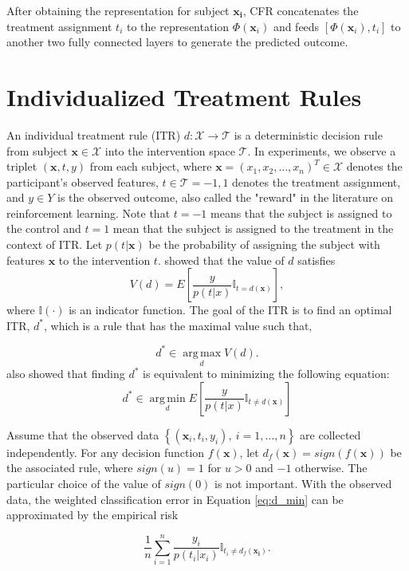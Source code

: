 \documentclass{article}
\begin{document}
After obtaining the representation for subject $\mathbf{x_i}$, CFR
concatenates the treatment assignment $t_i$ to the representation $\Phi(\mathbf{x}_i)$ and feeds $[\Phi(\mathbf{x}_i), t_i]$ to another two fully connected layers to generate the predicted outcome.
\section{Individualized Treatment Rules}
An individual treatment rule (ITR) $d: \mathcal{X} \rightarrow \mathcal{T}$ is a deterministic decision
rule from subject $\mathbf{x} \in \mathcal{X}$ into the intervention space $\mathcal{T}$. In experiments, we observe a triplet $(\mathbf{x}, t, y)$ from each
subject, where $\mathbf{x}=(x_1, x_2, \ldots, x_n)^T \in
\mathcal{X}$ denotes the participant's observed features, $t \in \mathcal{T}
= {-1,1}$ denotes the treatment assignment, and $y \in Y$ is the
observed outcome, also called the "reward" in the literature on
reinforcement learning. Note that $t=-1$ means that the subject is
assigned to the control and $t=1$ mean that the subject is assigned to
the treatment in the
context of ITR. Let $p(t|\mathbf{x})$ be the probability of assigning the subject
with features $\mathbf{x}$ to the intervention $t$. \cite{Qian2011-vz}
showed that the
value of $d$ satisfies
$$V(d) = E \left [ \frac{y}{p(t|x)}\mathbb{I}_{t=d(\mathbf{x})}\right
],$$
where $\mathbb{I}(\cdot)$ is an indicator function. The goal of the
ITR is to find an optimal ITR, $d^{*}$, which is a rule that has the maximal value such
that,

$$d^{*} \in \operatorname*{arg\,max}_d V(d).$$
\cite{Qian2011-vz} also showed that finding $d^{*}$ is equivalent to minimizing the following equation:
\begin{equation} \label{eq:d_min}
d^{*} \in \operatorname*{arg\,min}_d E \left [
  \frac{y}{p(t|x)}\mathbb{I}_{t \neq d(\mathbf{x})}\right
]
\end{equation}

Assume that the observed data $\left \{
  (\mathbf{x}_i,t_i,y_i),~i=1,\ldots , n \right \}$ are collected
independently. For any decision function $f(\mathbf{x})$, let
$d_f(\mathbf{x}) = sign(f(\mathbf{x}))$ be the associated rule, where
$sign(u) = 1$ for $u > 0$ and $-1$ otherwise. The particular choice of
the value of $sign(0)$ is not important. With the observed data, the
weighted classification error in Equation \ref{eq:d_min} can be approximated by
the empirical risk

\begin{equation} \label{eq:d_empirical_min}
  \frac{1}{n}\sum_{i=1}^{n}\frac{y_i}{p(t_i|x_i)}\mathbb{I}_{t_i \neq
    d_f(\mathbf{x_i})} .
\end{equation}
\end{document}
